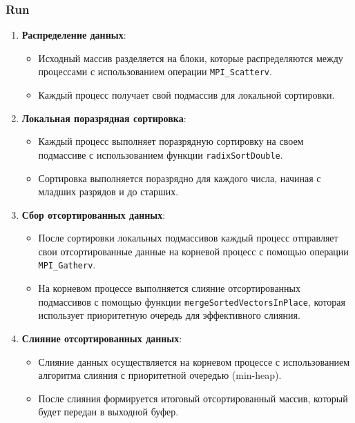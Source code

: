 \documentclass[12pt]{article}
\begin{document}
	\subsubsection*{Run}
	
	\begin{enumerate}
		\item \textbf{Распределение данных}:
		\begin{itemize}
			\item Исходный массив разделяется на блоки, которые распределяются между процессами с использованием операции \texttt{MPI\_Scatterv}.
			\item Каждый процесс получает свой подмассив для локальной сортировки.
		\end{itemize}
		
		\item \textbf{Локальная поразрядная сортировка}:
		\begin{itemize}
			\item Каждый процесс выполняет поразрядную сортировку на своем подмассиве с использованием функции \texttt{radixSortDouble}.
			\item Сортировка выполняется поразрядно для каждого числа, начиная с младших разрядов и до старших.
		\end{itemize}
		
		\item \textbf{Сбор отсортированных данных}:
		\begin{itemize}
			\item После сортировки локальных подмассивов каждый процесс отправляет свои отсортированные данные на корневой процесс с помощью операции \texttt{MPI\_Gatherv}.
			\item На корневом процессе выполняется слияние отсортированных подмассивов с помощью функции \texttt{mergeSortedVectorsInPlace}, которая использует приоритетную очередь для эффективного слияния.
		\end{itemize}
		
		\item \textbf{Слияние отсортированных данных}:
		\begin{itemize}
			\item Слияние данных осуществляется на корневом процессе с использованием алгоритма слияния с приоритетной очередью (min-heap).
			\item После слияния формируется итоговый отсортированный массив, который будет передан в выходной буфер.
		\end{itemize}
	\end{enumerate}
	
\end{document}
